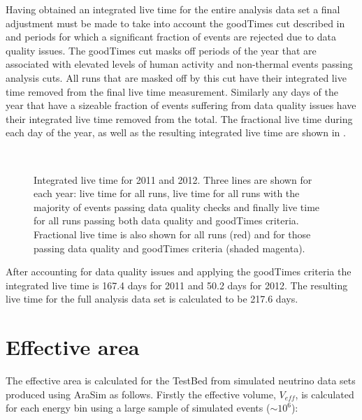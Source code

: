 Having obtained an integrated live time for the entire analysis data set a final adjustment must be made to take into account the goodTimes cut described in  and periods for which a significant fraction of events are rejected due to data quality issues. The goodTimes cut masks off periods of the year that are associated with elevated levels of human activity and non-thermal events passing analysis cuts. All runs that are masked off by this cut have their integrated live time removed from the final live time measurement. Similarly any days of the year that have a sizeable fraction of events suffering from data quality issues have their integrated live time removed from the total. The fractional live time during each day of the year, as well as the resulting integrated live time are shown in . 

\begin{figure}
  \hfill
  \\
  \hfill
  \caption{Integrated live time for 2011 and 2012. Three lines are shown for each year: live time for all runs, live time for all runs with the majority of events passing data quality checks and finally live time for all runs passing both data quality and goodTimes criteria. Fractional live time is also shown for all runs (red) and for those passing data quality and goodTimes criteria (shaded magenta).}
  \label{fig:Results:Integrated-LiveTime}
\end{figure}

After accounting for data quality issues and applying the goodTimes criteria the integrated live time is 167.4 days for 2011 and 50.2 days for 2012. The resulting live time for the full analysis data set is calculated to be 217.6 days.

\section{Effective area}
\label{sec:Results:Effective-Area}

The effective area is calculated for the TestBed from simulated neutrino data sets produced using AraSim as follows. Firstly the effective volume, $V_{eff}$, is calculated for each energy bin using a large sample of simulated events ($\sim 10^{6}$):

